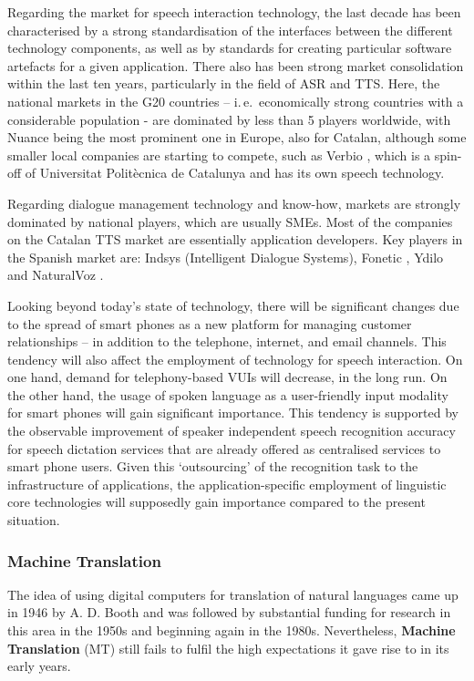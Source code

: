\begin{multicols}{2}
Regarding the market for speech interaction technology, the last decade has been characterised by a strong standardisation of the interfaces between the different technology components, as well as by standards for creating particular software artefacts for a given application. There also has been strong market consolidation within the last ten years, particularly in the field of ASR and TTS. Here, the national markets in the G20 countries – i.\,e.~economically strong countries with a considerable population - are dominated by less than 5 players worldwide, with Nuance being the most prominent one in Europe, also for Catalan, although some smaller local companies are starting to compete, such as Verbio \cite{CAT-Nota25}, which is a spin-off of Universitat Politècnica de Catalunya and has its own speech technology. 

Regarding dialogue management technology and know-how, markets are strongly dominated by national players, which are usually SMEs. Most of the companies on the Catalan TTS market are essentially application developers. Key players in the Spanish market are: Indsys \cite{CAT-Nota26} (Intelligent Dialogue Systems), Fonetic \cite{CAT-Nota27}, Ydilo \cite{CAT-Nota28} and NaturalVoz \cite{CAT-Nota29}.

Looking beyond today’s state of technology, there will be significant changes due to the spread of smart phones as a new platform for managing customer relationships – in addition to the telephone, internet, and email channels. This tendency will also affect the employment of technology for speech interaction. On one hand, demand for telephony-based VUIs will decrease, in the long run. On the other hand, the usage of spoken language as a user-friendly input modality for smart phones will gain significant importance. This tendency is supported by the observable improvement of speaker independent speech recognition accuracy for speech dictation services that are already offered as centralised services to smart phone users. Given this ‘outsourcing’ of the recognition task to the infrastructure of applications, the application-specific employment of linguistic core technologies will supposedly gain importance compared to the present situation. 

\subsubsection{Machine Translation}

The idea of using digital computers for translation of natural languages came up in 1946 by A. D. Booth and was followed by substantial funding for research in this area in the 1950s and beginning again in the 1980s. Nevertheless, \textbf{Machine Translation} (MT) still fails to fulfil the high expectations it gave rise to in its early years. 


\end{multicols}
